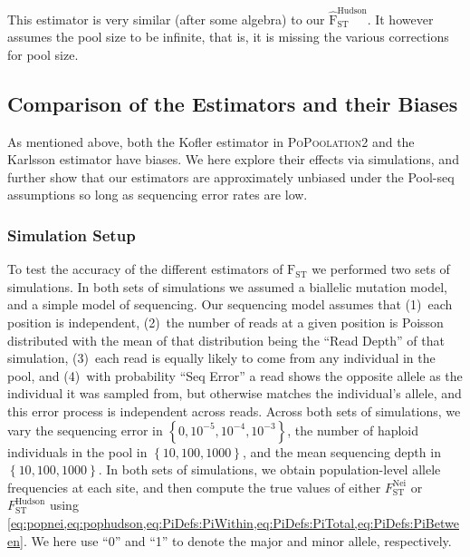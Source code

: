 \documentclass[a4paper,fontsize=9pt,DIV=14]{scrartcl}
\newcommand\toolname{\textsc}
\newcommand{\neifst}{F_\text{ST}^\text{Nei}}
\newcommand{\hudsonfst}{F_\text{ST}^\text{Hudson}}
\begin{document}
This estimator is very similar (after some algebra) to our $\widehat{\text{F}}_\text{ST}^\text{Hudson}$.
It however assumes the pool size to be infinite, that is, it is missing the various corrections for pool size.


\subsection{Comparison of the Estimators and their Biases}
\label{supp:sec:FST:sub:Comparison}

As mentioned above, both the Kofler estimator in \toolname{PoPoolation2} and the Karlsson estimator have biases.
We here explore their effects via simulations, and further show that our estimators are approximately unbiased under the Pool-seq assumptions so long as sequencing error rates are low.


\subsubsection*{Simulation Setup}
\label{supp:sec:FST:sub:Comparison:sub:Simulations}

To test the accuracy of the different estimators of $\text{F}_\text{ST}$ we performed two sets of simulations.  In both sets of simulations we assumed a biallelic mutation model, and a simple model of sequencing.  Our sequencing model assumes that (1)~each position is independent, (2)~the number of reads at a given position is Poisson distributed with the mean of that distribution being the ``Read Depth'' of that simulation, (3)~each read is equally likely to come from any individual in the pool, and (4)~with probability ``Seq Error'' a read shows the opposite allele as the individual it was sampled from, but otherwise matches the individual's allele, and this error process is independent across reads.  Across both sets of simulations, we vary the sequencing error in $\left\{0, 10^{-5}, 10^{-4}, 10^{-3}\right\}$, the number of haploid individuals in the pool in $\left\{10, 100, 1000\right\}$, and the mean sequencing depth in $\left\{10, 100, 1000\right\}$.  In both sets of simulations, we obtain population-level allele frequencies at each site, and then compute the true values of either $\neifst$ or $\hudsonfst$ using \cref{eq:popnei,eq:pophudson,eq:PiDefs:PiWithin,eq:PiDefs:PiTotal,eq:PiDefs:PiBetween}.
We here use ``0'' and ``1'' to denote the major and minor allele, respectively.
\end{document}
